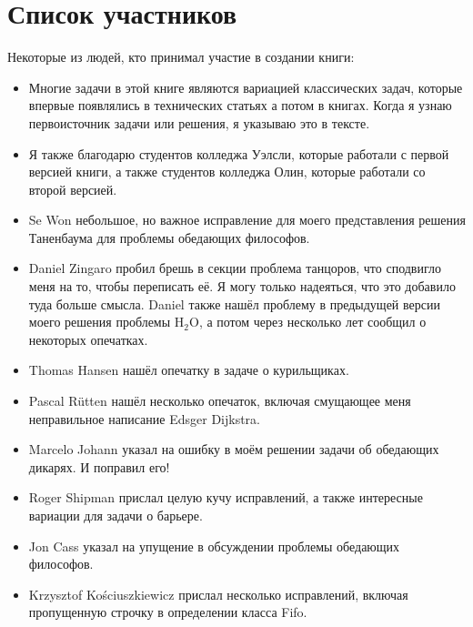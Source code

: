 \section*{Список участников}

Некоторые из людей, кто принимал участие в создании книги:

\begin{itemize}

\item Многие задачи в этой книге являются вариацией классических задач,
которые впервые появлялись в технических статьях а потом в книгах.
Когда я узнаю первоисточник задачи или решения, я указываю это в тексте.

\item Я также благодарю студентов колледжа Уэлсли, которые работали с
первой версией книги, а также студентов колледжа Олин, которые работали
со второй версией.

\item Se Won небольшое, но важное исправление для моего представления
решения Таненбаума для проблемы обедающих философов.

\item Daniel Zingaro пробил брешь в секции проблема танцоров, что
сподвигло меня на то, чтобы переписать её.
Я могу только надеяться, что это добавило туда больше смысла.
Daniel также нашёл проблему в предыдущей версии моего решения проблемы
H$_2$O, а потом через несколько лет сообщил о некоторых опечатках.

\item Thomas Hansen нашёл опечатку в задаче о курильщиках.

\item Pascal R\"{u}tten нашёл несколько опечаток, включая смущающее
меня неправильное написание Edsger Dijkstra.

\item Marcelo Johann указал на ошибку в моём решении задачи об обедающих
дикарях. И поправил его!

\item Roger Shipman прислал целую кучу исправлений, а также интересные
вариации для задачи о барьере.

\item Jon Cass указал на упущение в обсуждении проблемы обедающих философов.

\item Krzysztof Ko\'{s}ciuszkiewicz прислал несколько исправлений, включая
пропущенную строчку в определении класса Fifo.


\end{itemize}
